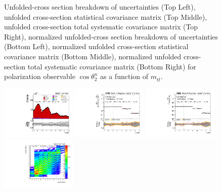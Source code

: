 \begin{figure}[htb]
\begin{center}
\caption{Unfolded-cross section breakdown of uncertainties (Top Left), unfolded cross-section statistical covariance matrix (Top Middle), unfolded cross-section total systematic covariance matrix (Top Right), normalized unfolded-cross section breakdown of uncertainties (Bottom Left), normalized unfolded cross-section statistical covariance matrix (Bottom Middle), normalized unfolded cross-section total systematic covariance matrix (Bottom Right) for polarization observable $\cos\theta_{2}^{n}$ as a function of $m_{t\bar{t}}$.}
\label{fig:b2n_mttbar_uncertainties}
\end{center}
\end{figure}
\clearpage
\begin{figure}[htb]
\begin{center}
 \includegraphics[width=0.32\textwidth]{fig_fullRun2UL/controlplots/combined/Hyp_AntiLeptonBr_vs_TTBarMass.pdf}
 \includegraphics[width=0.32\textwidth]{fig_fullRun2UL/unfolding/combined/UnfoldedResults_b1r_mttbar.pdf}
 \includegraphics[width=0.32\textwidth]{fig_fullRun2UL/unfolding/combined/UnfoldedResultsNorm_b1r_mttbar.pdf} \\
 \includegraphics[width=0.32\textwidth]{fig_fullRun2UL/unfolding/combined/ResponseMatrix_b1r_mttbar.pdf}

\end{center}
\end{figure}
